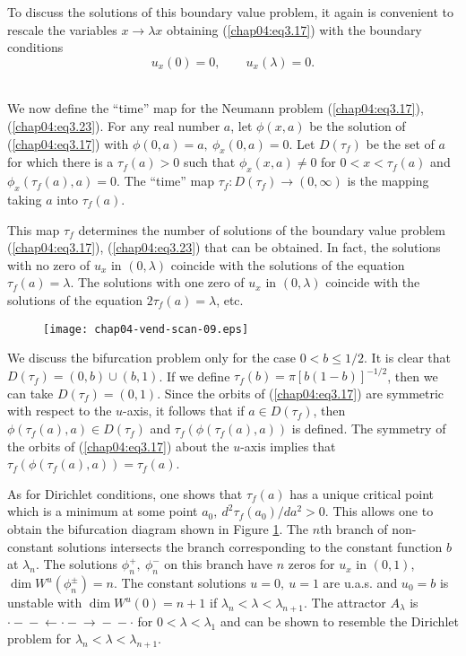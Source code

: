 \documentclass{surv-l}
\theoremstyle{plain}
\theoremstyle{definition}
\numberwithin{equation}{section}
\numberwithin{figure}{chapter}
\begin{document}
To discuss the solutions of this boundary value problem, it again is convenient to rescale the variables $x\rightarrow\lambda x$ obtaining (\ref{chap04:eq3.17}) with the boundary conditions
\begin{equation}\label{chap04:eq3.23}
u_{x}(0)=0,\qquad u_{x}(\lambda)=0.
\end{equation}\

We now define the ``time'' map for the Neumann problem (\ref{chap04:eq3.17}), (\ref{chap04:eq3.23}). For any real number $a$, let $\phi(x, a)$ be the solution of (\ref{chap04:eq3.17}) with $\phi(0, a)=a,\ \phi_{x}(0, a)= 0$. Let $D(\tau_{f})$ be the set of $a$ for which there is a $\tau_{f}(a)>0$ such that $\phi_{x}(x, a)\neq 0$ for $0<x<\tau_{f}(a)$ and $\phi_{x}(\tau_{f}(a), a)=0$. The ``time'' map $\tau_{f}\!:D(\tau_{f})\rightarrow(0, \infty)$ is the mapping taking $a$ into $\tau_{f}(a)$. 

This map $\tau_{f}$ determines the number of solutions of the boundary value problem (\ref{chap04:eq3.17}), (\ref{chap04:eq3.23}) that can be obtained. In fact, the solutions with no zero of $u_{x}$ in $(0, \lambda)$ coincide with the solutions of the equation $\tau_{f}(a) =\lambda$. The solutions with one zero of $u_{x}$ in $(0,\lambda)$ coincide with the solutions of the equation $2\tau_{f}(a)=\lambda$, etc.
\begin{figure}
\texttt{[image: chap04-vend-scan-09.eps]}
\caption{}\label{fig3.7}
\end{figure}

We discuss the bifurcation problem only for the case $0<b\leq 1/2$. It is clear that $D(\tau_{f})=(0, b)\cup(b, 1)$. If we define $\tau_{f}(b)=\pi[b(1-b)]^{-1/2}$, then we can take $D(\tau_{f})=(0,1)$. Since the orbits of (\ref{chap04:eq3.17}) are symmetric with respect to the $u$-axis, it follows that if $a\in D(\tau_{f})$, then $\phi(\tau_{f}(a), a)\in D(\tau_{f})$ and $\tau_{f}(\phi(\tau_{f}(a), a))$ is defined. The symmetry of the orbits of (\ref{chap04:eq3.17}) about the $u$-axis implies that $\tau_{f}(\phi(\tau_{f}(a), a))=\tau_{f}(a)$.

As for Dirichlet conditions, one shows that $\tau_{f}(a)$ has a unique critical point which is a minimum at some point $a_{0},\ d^{2}\tau_{f}(a_{0})/da^{2}>0$. This allows one to obtain the bifurcation diagram shown in Figure \ref{fig3.7}. The $n$th branch of non-constant solutions intersects the branch corresponding to the constant function $b$ at $\lambda_{n}$. The solutions $\phi_{n}^{+},\ \phi_{n}^{-}$ on this branch have $n$ zeros for $u_{x}$ in $(0,1)$, $\dim W^{u}(\phi_{n}^{\pm})=n$. The constant solutions $u=0,\ u=1$ are u.a.s. and $u_{0}=b$ is unstable with $\dim W^{u}(0)=n+1$ if $\lambda_{n}<\lambda<\lambda_{n+1}$. The attractor $A_{\lambda}$ is $\cdot-\!\!\!-\!\!\!\leftarrow\cdot-\!\!\!\rightarrow\!\!\!-\!\!\!-\cdot$ for $0<\lambda<\lambda_{1}$ and can be shown to resemble the Dirichlet problem for $\lambda_{n}<\lambda<\lambda_{n+1}$.
\end{document}

